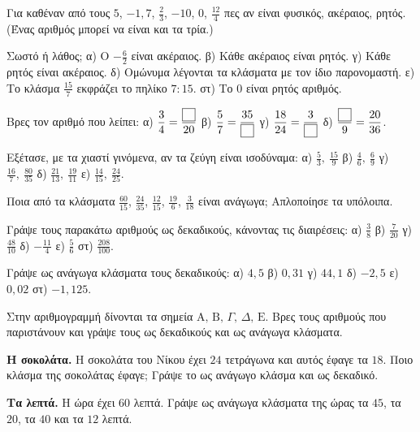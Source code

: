 

\ex Για καθέναν από τους $5$, $-1{,}7$, $\frac{2}{3}$, $-10$, $0$, $\frac{12}{4}$ πες αν είναι φυσικός, ακέραιος, ρητός. (Ένας αριθμός μπορεί να είναι και τα τρία.)

\ex Σωστό ή λάθος; α) Ο $-\frac{6}{2}$ είναι ακέραιος. \quad β) Κάθε ακέραιος είναι ρητός. \quad γ) Κάθε ρητός είναι ακέραιος. \quad δ) Ομώνυμα λέγονται τα κλάσματα με τον ίδιο παρονομαστή. \quad ε) Το κλάσμα $\frac{15}{7}$ εκφράζει το πηλίκο $7:15$. \quad στ) Το $0$ είναι ρητός αριθμός.

\ex Βρες τον αριθμό που λείπει: α) $\frac{3}{4}=\frac{\kouti}{20}$ \quad β) $\frac{5}{7}=\frac{35}{\kouti}$ \quad γ) $\frac{18}{24}=\frac{3}{\kouti}$ \quad δ) $\frac{\kouti}{9}=\frac{20}{36}$.

\ex Εξέτασε, με τα χιαστί γινόμενα, αν τα ζεύγη είναι ισοδύναμα: α) $\frac{5}{3},\ \frac{15}{9}$ \quad β) $\frac{4}{6},\ \frac{6}{9}$ \quad γ) $\frac{16}{7},\ \frac{80}{35}$ \quad δ) $\frac{21}{13},\ \frac{19}{11}$ \quad ε) $\frac{14}{15},\ \frac{24}{25}$.

\ex Ποια από τα κλάσματα $\frac{60}{15}$, $\frac{24}{35}$, $\frac{12}{15}$, $\frac{19}{6}$, $\frac{3}{18}$ είναι ανάγωγα; Απλοποίησε τα υπόλοιπα.

\ex Γράψε τους παρακάτω αριθμούς ως δεκαδικούς, κάνοντας τις διαιρέσεις: α) $\frac{3}{8}$ \quad β) $\frac{7}{20}$ \quad γ) $\frac{48}{10}$ \quad δ) $-\frac{11}{4}$ \quad ε) $\frac{5}{6}$ \quad στ) $\frac{208}{100}$.

\ex Γράψε ως ανάγωγα κλάσματα τους δεκαδικούς: α) $4{,}5$ \quad β) $0{,}31$ \quad γ) $44{,}1$ \quad δ) $-2{,}5$ \quad ε) $0{,}02$ \quad στ) $-1{,}125$.

\ex Στην αριθμογραμμή δίνονται τα σημεία $\mathrm{Α},\,\mathrm{Β},\,\Gamma,\,\Delta,\,\mathrm{Ε}$. Βρες τους αριθμούς που παριστάνουν και γράψε τους ως δεκαδικούς και ως ανάγωγα κλάσματα.
\begin{center}
\end{center}


\ex \textbf{Η σοκολάτα.} Η σοκολάτα του Νίκου έχει $24$ τετράγωνα και αυτός έφαγε τα $18$. Ποιο κλάσμα της σοκολάτας έφαγε; Γράψε το ως ανάγωγο κλάσμα και ως δεκαδικό.

\ex \textbf{Τα λεπτά.} Η ώρα έχει $60$ λεπτά. Γράψε ως ανάγωγα κλάσματα της ώρας τα $45$, τα $20$, τα $40$ και τα $12$ λεπτά.

